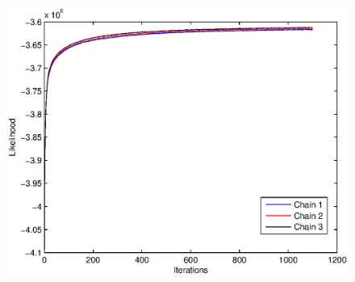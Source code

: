 \documentclass[11pt,a4paper]{article}
\begin{document}
	\begin{figure}
		\begin{center}
			\includegraphics[scale=1.0]{bigram_plot}
		\end{center}
	\end{figure}
\end{document}
